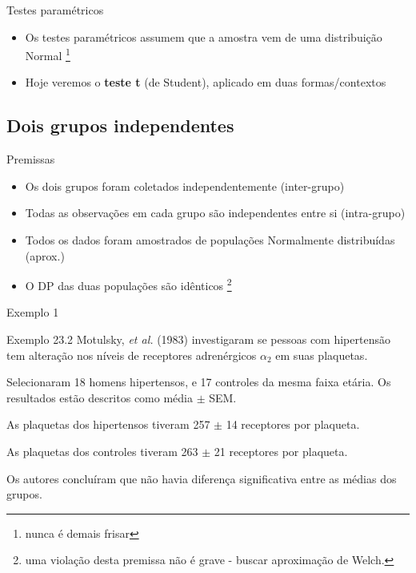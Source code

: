 \documentclass{beamer}
\begin{document}
\begin{frame}{Testes paramétricos}
  \begin{itemize}
  \item Os testes paramétricos assumem que a amostra vem de uma \alert{distribuição Normal} \footnote{nunca é demais frisar}
  \item Hoje veremos o {\bf teste t} (de Student), aplicado em duas formas/contextos
  \end{itemize}
\end{frame}

\subsection{Dois grupos independentes}

\begin{frame}{Premissas}
  \begin{itemize}
  \item Os dois grupos foram coletados independentemente (inter-grupo)
  \item Todas as observações em cada grupo são independentes entre si (intra-grupo)
  \item Todos os dados foram amostrados de populações Normalmente distribuídas (aprox.)
  \item O DP das duas populações são idênticos \footnote{uma violação desta premissa não é grave - buscar aproximação de Welch.}
  \end{itemize}
\end{frame}

\begin{frame}{Exemplo 1}
  \begin{exampleblock}{Exemplo 23.2}
    \small
    Motulsky, {\em et al.} (1983) investigaram se pessoas com hipertensão tem alteração nos níveis de receptores adrenérgicos $\alpha_2$ em suas plaquetas.

    \bigskip
    {\footnotesize
      Selecionaram 18 homens hipertensos, e 17 controles da mesma faixa etária.
      Os resultados estão descritos como média $\pm$ SEM.
    }

    \begin{exampleblock}{}
      \footnotesize
      As plaquetas dos hipertensos tiveram 257 $\pm$ 14 receptores por plaqueta.

      As plaquetas dos controles tiveram 263 $\pm$ 21 receptores por plaqueta.
    \end{exampleblock}
    \bigskip
    Os autores concluíram que não havia diferença significativa entre as médias dos grupos.
  \end{exampleblock}
\end{frame}
\end{document}
